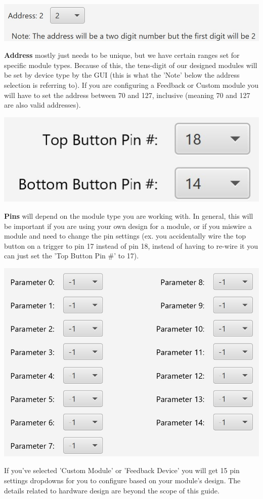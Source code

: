 \documentclass{article}
\begin{document}
\begin{center}
\includegraphics{AddrField}
\end{center}
\textbf{Address} mostly just needs to be unique, but we have certain ranges set for specific module types. Because of this, the tens-digit of our designed modules will be set by device type by the GUI (this is what the 'Note' below the address selection is referring to). If you are configuring a Feedback or Custom module you will have to set the address between 70 and 127, inclusive (meaning 70 and 127 are also valid addresses).

\begin{center}
\includegraphics{PinsField1}
\end{center}
\textbf{Pins} will depend on the module type you are working with. In general, this will be important if you are using your own design for a module, or if you miswire a module and need to change the pin settings (ex. you accidentally wire the top button on a trigger to pin 17 instead of pin 18, instead of having to re-wire it you can just set the 'Top Button Pin \#' to 17).

\newpage
\begin{center}
\includegraphics{PinsField2}
\end{center}
If you've selected 'Custom Module' or 'Feedback Device' you will get 15 pin settings dropdowns for you to configure based on your module's design. The details related to hardware design are beyond the scope of this guide.
\end{document}
